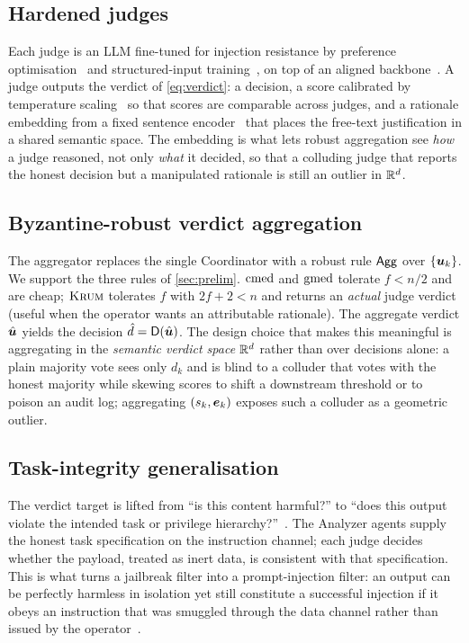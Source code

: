 \subsection{Hardened judges}
\label{sec:hardened}
Each judge is an LLM fine-tuned for injection resistance by preference
optimisation~\cite{chen2025secalign,rafailov2023dpo} and structured-input
training~\cite{chen2024struq}, on top of an aligned backbone~\cite{ouyang2022instructgpt,bai2022constitutional,touvron2023llama2}.
A judge outputs the verdict of \cref{eq:verdict}: a decision, a score calibrated by
temperature scaling~\cite{guo2017calibration} so that scores are comparable across judges,
and a rationale embedding from a fixed sentence
encoder~\cite{reimers2019sentencebert,gao2021simcse} that places the free-text
justification in a shared semantic space. The embedding is what lets robust aggregation
see \emph{how} a judge reasoned, not only \emph{what} it decided, so that a colluding
judge that reports the honest decision but a manipulated rationale is still an outlier in
$\mathbb{R}^d$.

\subsection{Byzantine-robust verdict aggregation}
\label{sec:aggregation}
The aggregator replaces the single Coordinator with a robust rule $\mathsf{Agg}$ over
$\{\bm{u}_k\}$. We support the three rules of \cref{sec:prelim}. $\operatorname{cmed}$ and $\operatorname{gmed}$
tolerate $f<n/2$ and are cheap; $\textsc{Krum}$ tolerates $f$ with $2f{+}2<n$ and returns an
\emph{actual} judge verdict (useful when the operator wants an attributable rationale).
The aggregate verdict $\hat{\bm{u}}$ yields the decision $\hat d=\mathsf{D}(\hat{\bm{u}})$. The design choice
that makes this meaningful is aggregating in the \emph{semantic verdict space} $\mathbb{R}^d$
rather than over decisions alone: a plain majority vote sees only $d_k$ and is blind to a
colluder that votes with the honest majority while skewing scores to shift a downstream
threshold or to poison an audit log; aggregating $(s_k,\bm{e}_k)$ exposes such a
colluder as a geometric outlier.

\subsection{Task-integrity generalisation}
\label{sec:taskintegrity}
The verdict target is lifted from ``is this content harmful?'' to ``does this output
violate the intended task or privilege hierarchy?''~\cite{wallace2024instruction}. The
Analyzer agents supply the honest task specification on the instruction channel; each
judge decides whether the payload, treated as inert data, is consistent with that
specification. This is what turns a jailbreak filter into a prompt-injection filter: an
output can be perfectly harmless in isolation yet still constitute a successful injection
if it obeys an instruction that was smuggled through the data channel rather than issued
by the operator~\cite{greshake2023injection,liu2024formalizing}.

